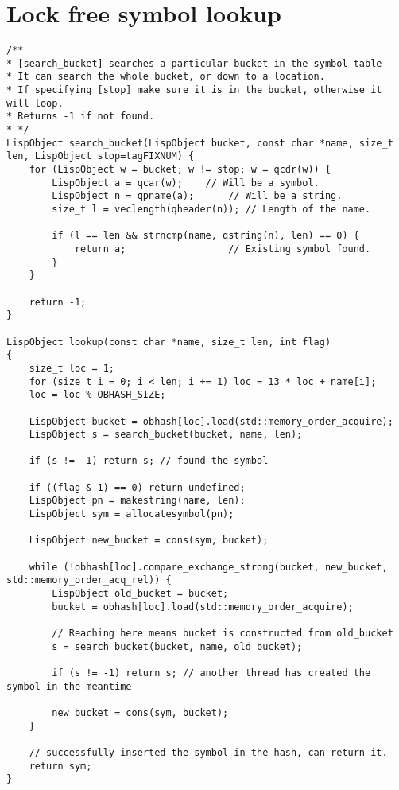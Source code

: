 \section{Lock free symbol lookup}
\label{sec:lockfree-code}

\begin{verbatim}
/**
* [search_bucket] searches a particular bucket in the symbol table
* It can search the whole bucket, or down to a location.
* If specifying [stop] make sure it is in the bucket, otherwise it will loop.
* Returns -1 if not found.
* */
LispObject search_bucket(LispObject bucket, const char *name, size_t len, LispObject stop=tagFIXNUM) {
    for (LispObject w = bucket; w != stop; w = qcdr(w)) {
        LispObject a = qcar(w);    // Will be a symbol.
        LispObject n = qpname(a);      // Will be a string.
        size_t l = veclength(qheader(n)); // Length of the name.

        if (l == len && strncmp(name, qstring(n), len) == 0) {
            return a;                  // Existing symbol found.
        }
    }

    return -1;
}

LispObject lookup(const char *name, size_t len, int flag)
{
    size_t loc = 1;
    for (size_t i = 0; i < len; i += 1) loc = 13 * loc + name[i];
    loc = loc % OBHASH_SIZE;

    LispObject bucket = obhash[loc].load(std::memory_order_acquire);
    LispObject s = search_bucket(bucket, name, len);

    if (s != -1) return s; // found the symbol

    if ((flag & 1) == 0) return undefined;
    LispObject pn = makestring(name, len);
    LispObject sym = allocatesymbol(pn);

    LispObject new_bucket = cons(sym, bucket);

    while (!obhash[loc].compare_exchange_strong(bucket, new_bucket, std::memory_order_acq_rel)) {
        LispObject old_bucket = bucket;
        bucket = obhash[loc].load(std::memory_order_acquire);

        // Reaching here means bucket is constructed from old_bucket
        s = search_bucket(bucket, name, old_bucket);

        if (s != -1) return s; // another thread has created the symbol in the meantime

        new_bucket = cons(sym, bucket);
    }

    // successfully inserted the symbol in the hash, can return it.
    return sym;
}
\end{verbatim}


